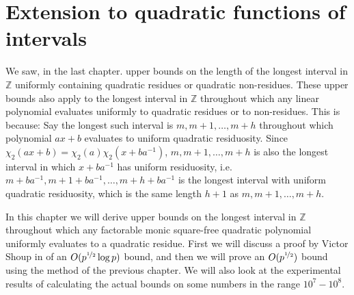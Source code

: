 \documentclass{report}
\begin{document}
\chapter{Extension to quadratic functions of intervals}


We saw, in the last chapter. upper bounds on the length of the longest interval in $\mathbb{Z}$ uniformly containing quadratic residues or quadratic non-residues. These upper bounds also apply to the longest interval in $\mathbb{Z}$ throughout which any linear polynomial evaluates uniformly to quadratic residues or to non-residues. This is because: Say the longest such interval is $m, m+1,\ldots,m+h$ throughout which polynomial $ax+b$ evaluates to uniform quadratic residuosity. Since $\chi_2(ax+b)=\chi_2(a)\chi_2(x+ba^{-1})$, $m, m+1,\ldots,m+h$ is also the longest interval in which $x+ba^{-1}$ has uniform residuosity, i.e. $m+ba^{-1}, m+1+ba^{-1},\ldots,m+h+ba^{-1}$ is the longest interval with uniform quadratic residuosity, which is the same length $h+1$ as $m, m+1,\ldots,m+h$.

In this chapter we will derive upper bounds on the longest interval in $\mathbb{Z}$ throughout which any factorable monic square-free quadratic polynomial uniformly evaluates to a quadratic residue. First we will discuss a proof by Victor Shoup in \cite{shoup} of an $O(p^{\nicefrac{1}{2}}\log p)$ bound, and then we will prove an $O(p^ {\nicefrac {1}{2}})$ bound using the method of the previous chapter. We will also look at the experimental results of calculating the actual bounds on some numbers in the range $10^{7}-10^{8}$.
%
%
\end{document}

